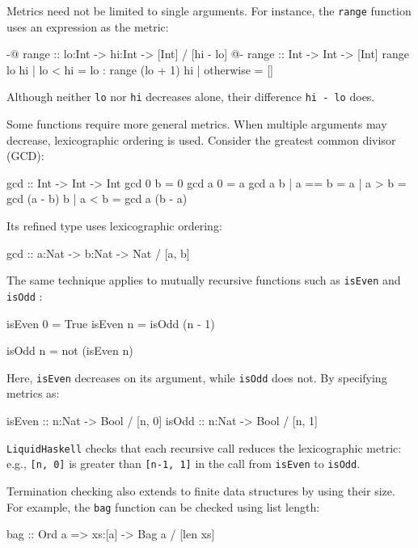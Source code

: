 Metrics need not be limited to single arguments.
For instance, the \texttt{range} function uses an expression as the metric:

\begin{code}
	{-@ range :: lo:Int -> hi:Int -> [Int] / [hi - lo] @-}
	range :: Int -> Int -> [Int]
	range lo hi
	| lo < hi = lo : range (lo + 1) hi
	| otherwise = []
\end{code}

Although neither \texttt{lo} nor \texttt{hi} decreases alone, their difference \texttt{hi - lo} does.

Some functions require more general metrics.
When multiple arguments may decrease, lexicographic ordering is used.
Consider the greatest common divisor (GCD):

\begin{code}
	gcd :: Int -> Int -> Int
	gcd 0 b = 0
	gcd a 0 = a
	gcd a b | a == b = a
	| a > b = gcd (a - b) b
	| a < b = gcd a (b - a)
\end{code}

Its refined type uses lexicographic ordering:

\begin{code}
	gcd :: a:Nat -> b:Nat -> Nat / [a, b]
\end{code}

The same technique applies to mutually recursive functions such as \texttt{isEven} and \texttt{isOdd} \cite{vazou_liquidhaskell_2014}:

\begin{code}
	isEven 0 = True
	isEven n = isOdd (n - 1)

	isOdd n = not (isEven n)
\end{code}

Here, \texttt{isEven} decreases on its argument, while \texttt{isOdd} does not.
By specifying metrics as:

\begin{code}
	isEven :: n:Nat -> Bool / [n, 0]
	isOdd :: n:Nat -> Bool / [n, 1]
\end{code}

\texttt{LiquidHaskell} checks that each recursive call reduces the lexicographic metric: e.g., \texttt{[n, 0]} is greater than \texttt{[n-1, 1]} in the call from \texttt{isEven} to \texttt{isOdd}.

Termination checking also extends to finite data structures by using their size.
For example, the \texttt{bag} function can be checked using list length:

\begin{code}
	bag :: Ord a => xs:[a] -> Bag a / [len xs]
\end{code}

